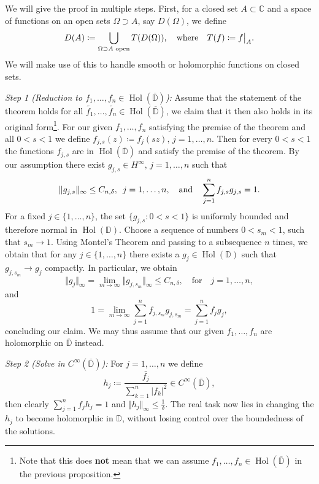 \documentclass[letterpaper, 11pt]{article}
\newcommand{\C}{\mathbb{C}}
\newcommand{\D}{\mathbb{D}}
\newcommand{\1}{\mathds{1}}
\newcommand{\cl}[1]{\overline{#1}}
\newcommand{\restr}[2]{{%
  \left.\kern-\nulldelimiterspace %
  #1 %
  \littletaller %
  \right|_{#2} %
  }}
\newcommand{\littletaller}{\mathchoice{\vphantom{\big|}}{}{}{}}
\DeclareMathOperator*{\Hol}{Hol}
\theoremstyle{definition}
\newenvironment{innerproof}
 {\renewcommand{\qedsymbol}{}\proof}
 {\endproof}
\begin{document}
\begin{innerproof}
  We will give the proof in multiple steps. First, for a closed set $A \subset \C$ and a space of functions on an open sets $\Omega \supset A$, say $D(\Omega)$, we define
  \begin{equation*}
    D(A) \coloneqq \bigcup_{\Omega \supset A \textrm{ open}} T(D(\Omega)), \quad \textrm{where} \quad T(f) \coloneqq \restr{f}{A}.
  \end{equation*}
  We will make use of this to handle smooth or holomorphic functions on closed sets.

  \textit{Step 1 (Reduction to $f_1, \dots, f_n \in \Hol(\cl{\D})$):} Assume that the statement of the theorem holds for all $\widetilde{f_1}, \dots, \widetilde{f_n} \in \Hol(\cl{\D})$, we claim that it then also holds in its original form\footnote{Note that this does \textbf{not} mean that we can assume $f_1, \dots, f_n \in \Hol(\cl{\D})$ in the previous proposition.}. For our given $f_1, \dots, f_n$ satisfying the premise of the theorem and all $0 < s < 1$ we define $ f_{j,s}(z) \coloneqq f_{j}(sz), \, j=1,\dots,n $. Then for every $0 < s < 1$ the functions $f_{j,s}$ are in $\Hol(\cl{\D})$ and satisfy the premise of the theorem. By our assumption there exist $g_{j,s} \in H^\infty, \, j=1,\dots,n$ such that
  $$ \Vert g_{j,s} \Vert_\infty \leq C_{n,\delta}, \hspace{0.5em} j = 1, \dots, n, \quad \textrm{and} \quad \sum_{j=1}^n f_{j,s} g_{j,s} = 1. $$
  For a fixed $j \in \{ 1, \dots, n \}$, the set $\{ g_{j,s} : 0 < s < 1 \}$ is uniformly bounded and therefore normal in $\Hol(\D)$. Choose a sequence of numbers $0 < s_m < 1$, such that $s_m \to 1$. Using Montel's Theorem and passing to a subsequence $n$ times, we obtain that for any $j \in \{ 1, \dots, n \}$ there exists a $g_j \in \Hol(\D)$ such that $g_{j,s_m} \to g_j $ compactly. In particular, we obtain
  $$ \Vert g_j \Vert_\infty = \lim_{m \to \infty} \Vert g_{j,s_m} \Vert_\infty \leq C_{n,\delta}, \quad \textrm{for} \quad j=1,\dots,n, $$
  and
  $$ 1 = \lim_{m \to \infty} \sum_{j=1}^n f_{j,s_m} g_{j,s_m} = \sum_{j=1}^n f_j g_j, $$
  concluding our claim. We may thus assume that our given $f_1, \dots, f_n$ are holomorphic on $\cl{\D}$ instead.

  \textit{Step 2 (Solve in $C^\infty(\cl{\D})$):} For $j=1,\dots,n$ we define
  $$ h_j \coloneqq \frac{\bar{f_j}}{\sum_{k=1}^n \vert f_k \vert^2} \in C^\infty(\cl{\D}), $$
  then clearly $ \sum_{j=1}^n f_j h_j = 1$ and $\Vert h_j \Vert_\infty \leq \frac{1}{\delta}$. The real task now lies in changing the $h_j$ to become holomorphic in $\D$, without losing control over the boundedness of the solutions.
\end{innerproof}
\end{document}
